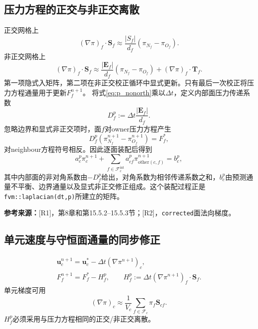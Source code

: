 \documentclass[UTF8,12pt,a4paper]{ctexart}
\numberwithin{equation}{section}
\newcommand{\dt}{\Delta t}
\newcommand{\Rone}{\textnormal{[R1]}}
\newcommand{\Rtwo}{\textnormal{[R2]}}
\newcommand{\source}[1]{\par\smallskip\noindent\colorbox{sourcebg}{%
  \parbox{0.955\linewidth}{\footnotesize\color{sourcegray}\textbf{参考来源：}#1}}\par\smallskip}
\begin{document}
\subsection{压力方程的正交与非正交离散}
正交网格上
\begin{equation}
  (\nabla\pi)_f\cdot\bm S_f
  \approx\frac{|S_f|}{d_f}(\pi_{N_f}-\pi_{O_f}).
\end{equation}
非正交网格上
\begin{equation}
  (\nabla\pi)_f\cdot\bm S_f
  \approx\frac{|\bm E_f|}{d_f}(\pi_{N_f}-\pi_{O_f})
  +(\nabla\pi)_f\cdot\bm T_f.
  \label{eq:p_nonorth}
\end{equation}
第一项隐式入矩阵，第二项在非正交校正循环中显式更新。只有最后一次校正将压力方程通量用于更新$F_f^{n+1}$。
将式\eqref{eq:p_nonorth}乘以$\dt$，定义内部面压力传递系数
\begin{equation}
  D_f^p:=\dt\frac{|\bm E_f|}{d_f}.
\end{equation}
忽略边界和显式非正交项时，面$f$对owner压力方程产生
\begin{equation}
  D_f^p(\pi_{N_f}^{n+1}-\pi_{O_f}^{n+1})=F_f^*,
\end{equation}
对neighbour方程符号相反。因此逐面装配后得到
\begin{equation}
  \boxed{a_c^p\pi_c^{n+1}
  +\sum_{f\in\mathcal F_c^{\mathrm{int}}}a_{cf}^p
  \pi_{\mathrm{other}(c,f)}^{n+1}=b_c^p,}
  \label{eq:projection_pressure_matrix}
\end{equation}
其中内部面的非对角系数由$-D_f^p$给出，对角系数为相邻传递系数之和，$b_c^p$由预测通量不平衡、边界通量以及显式非正交修正组成。这个装配过程正是\texttt{fvm::laplacian(dt,p)}所建立的矩阵。
\source{\Rone，第8章和第15.5.2--15.5.3节；\Rtwo，\texttt{corrected}面法向梯度。}

\subsection{单元速度与守恒面通量的同步修正}
\begin{align}
  \boxed{\bm u_c^{n+1}
  =\bm u_c^*-\dt(\nabla\pi^{n+1})_c,}
  \label{eq:cell_velocity_correction}\\
  \boxed{F_f^{n+1}=F_f^*-H_f^p,\qquad
  H_f^p:=\dt(\nabla\pi^{n+1})_f\cdot\bm S_f.}
  \label{eq:final_phi}
\end{align}
单元梯度可用
\begin{equation}
  (\nabla\pi)_c\approx \frac{1}{V_c}
  \sum_{f\in\mathcal F_c}\pi_f\bm S_{cf}.
\end{equation}
$H_f^p$必须采用与压力方程相同的正交/非正交离散。
\end{document}
